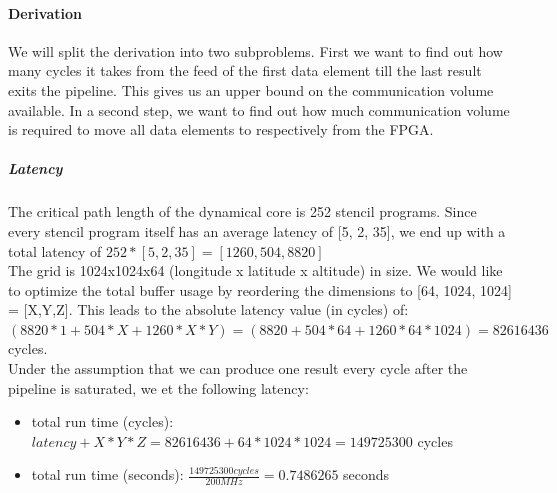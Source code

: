 \paragraph{Derivation}
We will split the derivation into two subproblems. First we want to find out how many cycles it takes from the feed of the first data element till the last result exits the pipeline. This gives us an upper bound on the communication volume available. In a second step, we want to find out how much communication volume is required to move all data elements to respectively from the FPGA.

\subparagraph{Latency}
The critical path length of the dynamical core is 252 stencil programs. Since every stencil program itself has an average latency of [5, 2, 35], we end up with a total latency of $252 * [5, 2, 35] = [1260, 504, 8820]$ \\
The grid is 1024x1024x64 (longitude x latitude x altitude) in size. We would like to optimize the total buffer usage by reordering the dimensions to [64, 1024, 1024] = [X,Y,Z]. This leads to the absolute latency value (in cycles) of: $(8820*1 + 504*X + 1260*X*Y) = (8820 + 504*64 + 1260*64*1024) = 82616436$ cycles. \\
Under the assumption that we can produce one result every cycle after the pipeline is saturated, we et the following latency:
\begin{itemize}
	\item total run time (cycles): $latency + X*Y*Z = 82616436 + 64*1024*1024 = 149725300$ cycles
	\item total run time (seconds): $\frac{149725300 cycles}{200MHz} = 0.7486265$ seconds
\end{itemize}


